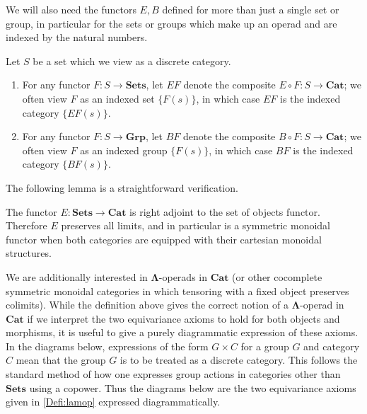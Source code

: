 \documentclass{amsbook} %
\newcommand{\mb}{\mathbf}
\numberwithin{section}{chapter}
\begin{document}
We will also need the functors $E, B$ defined for more than just a single set or group, in particular for the sets or groups which make up an operad and are indexed by the natural numbers.

\begin{nota}\label{nota:e_b}
Let $S$ be a set which we view as a discrete category.
\begin{enumerate}
\item For any functor $F:S \rightarrow \mb{Sets}$, let $EF$ denote the composite $E \circ F:S \rightarrow \mb{Cat}$; we often view $F$ as an indexed set $\{ F(s) \}$, in which case $EF$ is the indexed category $\{ EF(s) \}$.
\item For any functor $F:S \rightarrow \mb{Grp}$, let $BF$ denote the composite $B \circ F:S \rightarrow \mb{Cat}$; we often view $F$ as an indexed group $\{ F(s) \}$, in which case $BF$ is the indexed category $\{ BF(s) \}$.
\end{enumerate}
\end{nota}

The following lemma is a straightforward verification.

\begin{lem}\label{symmoncor}
The functor $E:\mb{Sets} \rightarrow \mb{Cat}$ is right adjoint to the set of objects functor.  Therefore $E$ preserves all limits, and in particular is a symmetric monoidal functor when both categories are equipped with their cartesian monoidal structures.
\end{lem}

We are additionally interested in $\mb{\Lambda}$-operads in $\mb{Cat}$ (or other cocomplete symmetric monoidal categories in which tensoring with a fixed object preserves colimits).  While the definition above gives the correct notion of a $\mb{\Lambda}$-operad in $\mb{Cat}$ if we interpret the two equivariance axioms to hold for both objects and morphisms, it is useful to give a purely diagrammatic expression of these axioms.  In the diagrams below, expressions of the form $G \times C$ for a group $G$ and category $C$ mean that the group $G$ is to be treated as a discrete category.  This follows the standard method of how one expresses group actions in categories other than $\mb{Sets}$ using a copower.  Thus the diagrams below are the two equivariance axioms given in \cref{Defi:lamop} expressed diagrammatically.
\end{document}
